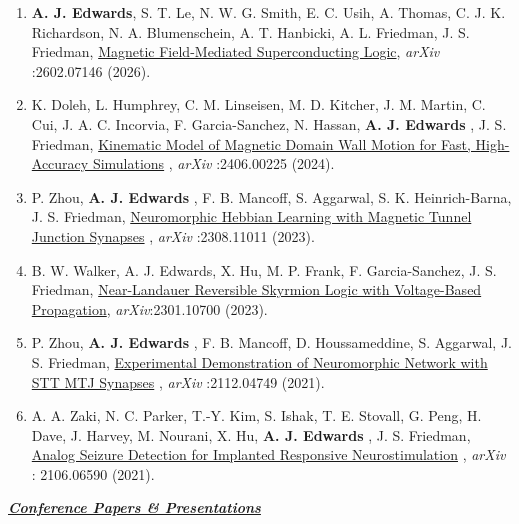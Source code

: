 \documentclass[12pt]{article}
\begin{document}
\begin{enumerate}
\item \textbf{A. J. Edwards}, S. T. Le, N. W. G. Smith, E. C. Usih, A. Thomas, C. J. K. Richardson, N. A. Blumenschein, A. T. Hanbicki, A. L. Friedman, J. S. Friedman, \href{https://arxiv.org/abs/2602.07146}{Magnetic Field-Mediated Superconducting Logic}, \textit{arXiv} :2602.07146 (2026).
\item K. Doleh, L. Humphrey, C. M. Linseisen, M. D. Kitcher, J. M. Martin, C. Cui, J. A. C. Incorvia, F. Garcia-Sanchez, N. Hassan, \textbf{A. J. Edwards} , J. S. Friedman, \href{https://arxiv.org/abs/2406.00225}{Kinematic Model of Magnetic Domain Wall Motion for Fast, High-Accuracy Simulations} , \textit{arXiv} :2406.00225 (2024).
\item P. Zhou, \textbf{A. J. Edwards} , F. B. Mancoff, S. Aggarwal, S. K. Heinrich-Barna, J. S. Friedman, \href{https://arxiv.org/abs/2308.11011}{Neuromorphic Hebbian Learning with Magnetic Tunnel Junction Synapses} , \textit{arXiv} :2308.11011 (2023).
\item B. W. Walker, A. J. Edwards, X. Hu, M. P. Frank, F. Garcia-Sanchez, J. S. Friedman, \href{https://arxiv.org/abs/2301.10700}{Near-Landauer Reversible Skyrmion Logic with Voltage-Based Propagation}, \textit{arXiv}:2301.10700 (2023).
\item P. Zhou, \textbf{A. J. Edwards} , F. B. Mancoff, D. Houssameddine, S. Aggarwal, J. S. Friedman, \href{https://arxiv.org/abs/2112.04749}{Experimental Demonstration of Neuromorphic Network with STT MTJ Synapses} , \textit{arXiv} :2112.04749 (2021).
\item A. A. Zaki, N. C. Parker, T.-Y. Kim, S. Ishak, T. E. Stovall, G. Peng, H. Dave, J. Harvey, M. Nourani, X. Hu, \textbf{A. J. Edwards} , J. S. Friedman, \href{https://arxiv.org/abs/2106.06590}{Analog Seizure Detection for Implanted Responsive Neurostimulation} , \textit{arXiv} : 2106.06590 (2021).

\end{enumerate}

{\large \textit{\textbf{\ul{Conference Papers \& Presentations}}}}
\end{document}
